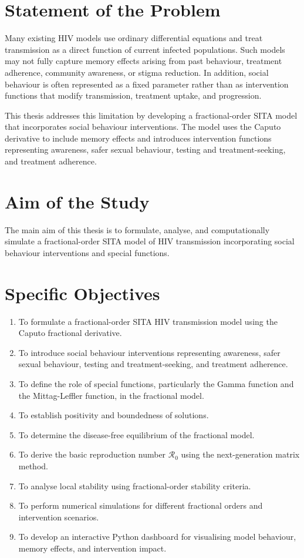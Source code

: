 \documentclass[12pt,a4paper,oneside]{report}
\newcommand{\Rzero}{\mathcal{R}_0}
\begin{document}
\section{Statement of the Problem}
Many existing HIV models use ordinary differential equations and treat transmission as a direct function of current infected populations. Such models may not fully capture memory effects arising from past behaviour, treatment adherence, community awareness, or stigma reduction. In addition, social behaviour is often represented as a fixed parameter rather than as intervention functions that modify transmission, treatment uptake, and progression.

This thesis addresses this limitation by developing a fractional-order SITA model that incorporates social behaviour interventions. The model uses the Caputo derivative to include memory effects and introduces intervention functions representing awareness, safer sexual behaviour, testing and treatment-seeking, and treatment adherence.

\section{Aim of the Study}
The main aim of this thesis is to formulate, analyse, and computationally simulate a fractional-order SITA model of HIV transmission incorporating social behaviour interventions and special functions.

\section{Specific Objectives}
\begin{enumerate}
  \item To formulate a fractional-order SITA HIV transmission model using the Caputo fractional derivative.
  \item To introduce social behaviour interventions representing awareness, safer sexual behaviour, testing and treatment-seeking, and treatment adherence.
  \item To define the role of special functions, particularly the Gamma function and the Mittag-Leffler function, in the fractional model.
  \item To establish positivity and boundedness of solutions.
  \item To determine the disease-free equilibrium of the fractional model.
  \item To derive the basic reproduction number $\Rzero$ using the next-generation matrix method.
  \item To analyse local stability using fractional-order stability criteria.
  \item To perform numerical simulations for different fractional orders and intervention scenarios.
  \item To develop an interactive Python dashboard for visualising model behaviour, memory effects, and intervention impact.
\end{enumerate}
\end{document}
